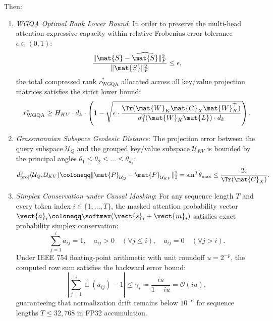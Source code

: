 \begin{theorem}
Then:
\begin{enumerate}
    \item \emph{WGQA Optimal Rank Lower Bound}:
    In order to preserve the multi-head attention expressive capacity within relative Frobenius error tolerance $\epsilon \in (0, 1)$:
    \begin{equation}
    \frac{\|\mat{S} - \widehat{\mat{S}}\|_F^2}{\|\mat{S}\|_F^2} \le \epsilon,
    \end{equation}
    the total compressed rank $r_{\text{WGQA}}^*$ allocated across all key/value projection matrices satisfies the strict lower bound:
    \begin{equation}
    r_{\text{WGQA}}^* \ge H_{KV} \cdot d_k \cdot \left( 1 - \sqrt{\epsilon \cdot \frac{\Tr(\mat{W}_K \mat{C}_X \mat{W}_K^\top)}{\sigma_1^2(\mat{W}_K \mat{L}) \cdot d_k}} \right).
    \label{eq:wgqa_rank_lower_bound}
    \end{equation}
    \item \emph{Grassmannian Subspace Geodesic Distance}:
    The projection error between the query subspace $\mathcal{U}_Q$ and the grouped key/value subspace $\mathcal{U}_{KV}$ is bounded by the principal angles $\theta_1 \le \theta_2 \le \dots \le \theta_{d_k}$:
    \begin{equation}
    d_{\text{proj}}^2(\mathcal{U}_Q, \mathcal{U}_{KV}) \coloneqq \|\mat{P}_{\mathcal{U}_Q} - \mat{P}_{\mathcal{U}_{KV}}\|_2^2 = \sin^2 \theta_{\max} \le \frac{2\epsilon}{\Tr(\mat{C}_X)}.
    \label{eq:grassmann_geodesic_bound}
    \end{equation}
    \item \emph{Simplex Conservation under Causal Masking}:
    For any sequence length $T$ and every token index $i \in \{1, \dots, T\}$, the masked attention probability vector $\vect{a}_i \coloneqq \softmax(\vect{s}_i + \vect{m}_i)$ satisfies exact probability simplex conservation:
    \begin{equation}
    \sum_{j=1}^i a_{ij} = 1, \quad a_{ij} > 0 \quad (\forall j \le i), \quad a_{ij} = 0 \quad (\forall j > i).
    \label{eq:simplex_conservation_exact}
    \end{equation}
    Under IEEE 754 floating-point arithmetic with unit roundoff $u = 2^{-p}$, the computed row sum satisfies the backward error bound:
    \begin{equation}
    \left| \sum_{j=1}^i \operatorname{fl}(a_{ij}) - 1 \right| \le \gamma_i \coloneqq \frac{i u}{1 - i u} = \mathcal{O}(i u),
    \label{eq:simplex_floating_point_bound}
    \end{equation}
    guaranteeing that normalization drift remains below $10^{-6}$ for sequence lengths $T \le 32{,}768$ in FP32 accumulation.
\end{enumerate}
\end{theorem}

